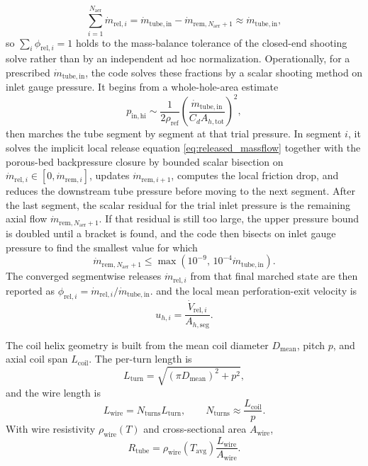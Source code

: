 \documentclass[11pt]{article}
\begin{document}
\[
\sum_{i=1}^{N_{\mathrm{aer}}}\dot m_{\mathrm{rel},i}
=\dot m_{\mathrm{tube,in}}-\dot m_{\mathrm{rem},N_{\mathrm{aer}}+1}
\approx \dot m_{\mathrm{tube,in}},
\]
so \(\sum_i \phi_{\mathrm{rel},i}=1\) holds to the mass-balance tolerance of the closed-end shooting solve rather than by an independent ad hoc normalization.
Operationally, for a prescribed \(\dot m_{\mathrm{tube,in}}\), the code solves these fractions by a scalar shooting method on inlet gauge pressure. It begins from a whole-hole-area estimate
\[
p_{\mathrm{in,hi}}\sim \frac{1}{2\rho_{\mathrm{ref}}}\left(\frac{\dot m_{\mathrm{tube,in}}}{C_d A_{h,\mathrm{tot}}}\right)^2,
\]
then marches the tube segment by segment at that trial pressure. In segment \(i\), it solves the implicit local release equation \eqref{eq:released_massflow} together with the porous-bed backpressure closure by bounded scalar bisection on \(\dot m_{\mathrm{rel},i}\in[0,\dot m_{\mathrm{rem},i}]\), updates \(\dot m_{\mathrm{rem},i+1}\), computes the local friction drop, and reduces the downstream tube pressure before moving to the next segment. After the last segment, the scalar residual for the trial inlet pressure is the remaining axial flow \(\dot m_{\mathrm{rem},N_{\mathrm{aer}}+1}\). If that residual is still too large, the upper pressure bound is doubled until a bracket is found, and the code then bisects on inlet gauge pressure to find the smallest value for which
\[
\dot m_{\mathrm{rem},N_{\mathrm{aer}}+1}\le \max\!\left(10^{-9},\,10^{-4}\dot m_{\mathrm{tube,in}}\right).
\]
The converged segmentwise releases \(\dot m_{\mathrm{rel},i}\) from that final marched state are then reported as \(\phi_{\mathrm{rel},i}=\dot m_{\mathrm{rel},i}/\dot m_{\mathrm{tube,in}}\).
and the local mean perforation-exit velocity is
\begin{equation}
\label{eq:hole_velocity}
u_{h,i}=\frac{\dot V_{\mathrm{rel},i}}{A_{h,\mathrm{seg}}}.
\end{equation}

The coil helix geometry is built from the mean coil diameter \(D_{\mathrm{mean}}\), pitch \(p\), and axial coil span \(L_{\mathrm{coil}}\). The per-turn length is
\begin{equation}
\label{eq:helix_turn_length}
L_{\mathrm{turn}}=\sqrt{(\pi D_{\mathrm{mean}})^2+p^2},
\end{equation}
and the wire length is
\begin{equation}
\label{eq:helix_total_length}
L_{\mathrm{wire}}=N_{\mathrm{turns}}L_{\mathrm{turn}},
\qquad
N_{\mathrm{turns}}\approx \frac{L_{\mathrm{coil}}}{p}.
\end{equation}
With wire resistivity \(\rho_{\mathrm{wire}}(T)\) and cross-sectional area \(A_{\mathrm{wire}}\),
\begin{equation}
\label{eq:wire_resistance}
R_{\mathrm{tube}}=\rho_{\mathrm{wire}}(T_{\mathrm{avg}})\frac{L_{\mathrm{wire}}}{A_{\mathrm{wire}}}.
\end{equation}
\end{document}
